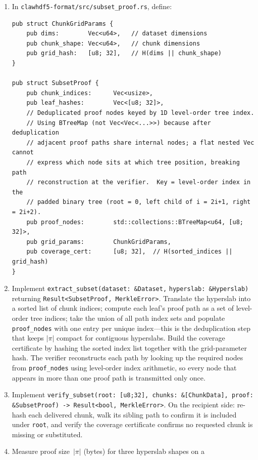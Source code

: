 \documentclass[11pt]{article}
\begin{document}
\begin{enumerate}[nosep]
  \item In \texttt{clawhdf5-format/src/subset\_proof.rs}, define:
\begin{lstlisting}
pub struct ChunkGridParams {
    pub dims:        Vec<u64>,   // dataset dimensions
    pub chunk_shape: Vec<u64>,   // chunk dimensions
    pub grid_hash:   [u8; 32],   // H(dims || chunk_shape)
}

pub struct SubsetProof {
    pub chunk_indices:      Vec<usize>,
    pub leaf_hashes:        Vec<[u8; 32]>,
    // Deduplicated proof nodes keyed by 1D level-order tree index.
    // Using BTreeMap (not Vec<Vec<...>>) because after deduplication
    // adjacent proof paths share internal nodes; a flat nested Vec cannot
    // express which node sits at which tree position, breaking path
    // reconstruction at the verifier.  Key = level-order index in the
    // padded binary tree (root = 0, left child of i = 2i+1, right = 2i+2).
    pub proof_nodes:        std::collections::BTreeMap<u64, [u8; 32]>,
    pub grid_params:        ChunkGridParams,
    pub coverage_cert:      [u8; 32],  // H(sorted_indices || grid_hash)
}
\end{lstlisting}
  \item Implement \texttt{extract\_subset(dataset: \&Dataset,}
    \texttt{hyperslab: \&Hyperslab)} returning
    \texttt{Result<SubsetProof, MerkleError>}. Translate
    the hyperslab into a sorted list of chunk indices; compute each leaf's
    proof path as a set of level-order tree indices; take the union of all
    path index sets and populate \texttt{proof\_nodes} with one entry per
    unique index---this is the deduplication step that keeps $|\pi|$
    compact for contiguous hyperslabs. Build the coverage certificate by
    hashing the sorted index list together with the grid-parameter hash.
    The verifier reconstructs each path by looking up the required nodes
    from \texttt{proof\_nodes} using level-order index arithmetic, so every
    node that appears in more than one proof path is transmitted only once.
  \item Implement \texttt{verify\_subset(root: [u8;32], chunks: \&[ChunkData],
    proof: \&SubsetProof) -> Result<bool, MerkleError>}. On the recipient
    side: re-hash each delivered chunk, walk its sibling path to confirm it
    is included under \texttt{root}, and verify the coverage certificate
    confirms no requested chunk is missing or substituted.
  \item Measure proof size~$|\pi|$ (bytes) for three hyperslab shapes on a

\end{enumerate}
\end{document}
